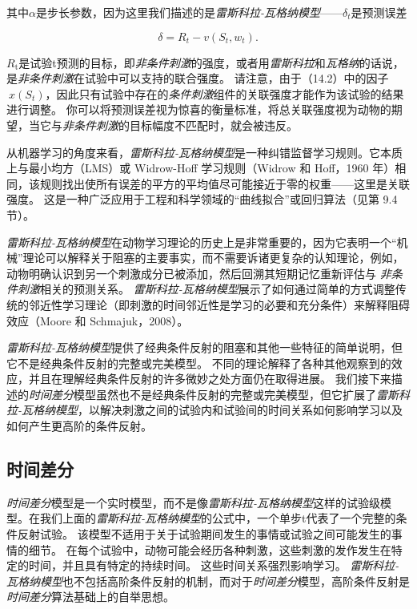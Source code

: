 其中$\alpha$是步长参数，因为这里我们描述的是\textit{雷斯科拉-瓦格纳模型}——$\delta_t $是预测误差

\begin{equation}\label{key}
	\delta = R_t - v (S_t, w_t).
\end{equation}


$R_{\mathrm{t}}$是试验t预测的目标，即\textit{非条件刺激}的强度，或者用\textit{雷斯科拉}和\textit{瓦格纳}的话说，是\textit{非条件刺激}在试验中可以支持的联合强度。
请注意，由于（14.2）中的因子$\ x(S_t)$，因此只有试验中存在的\textit{条件刺激}组件的关联强度才能作为该试验的结果进行调整。
你可以将预测误差视为惊喜的衡量标准，将总关联强度视为动物的期望，当它与\textit{非条件刺激}的目标幅度不匹配时，就会被违反。


从机器学习的角度来看，\textit{雷斯科拉-瓦格纳模型}是一种纠错监督学习规则。它本质上与最小均方（LMS）或 Widrow-Hoff 学习规则（Widrow 和 Hoff，1960 年）相同，该规则找出使所有误差的平方的平均值尽可能接近于零的权重——这里是关联强度。
这是一种广泛应用于工程和科学领域的“曲线拟合”或回归算法（见第 9.4 节）。




\textit{雷斯科拉-瓦格纳模型}在动物学习理论的历史上是非常重要的，因为它表明一个“机械”理论可以解释关于阻塞的主要事实，而不需要诉诸更复杂的认知理论，例如，动物明确认识到另一个刺激成分已被添加，然后回溯其短期记忆重新评估与 \textit{非条件刺激}相关的预测关系。
\textit{雷斯科拉-瓦格纳模型}展示了如何通过简单的方式调整传统的邻近性学习理论（即刺激的时间邻近性是学习的必要和充分条件）来解释阻碍效应（Moore 和 Schmajuk，2008）。


\textit{雷斯科拉-瓦格纳模型}提供了经典条件反射的阻塞和其他一些特征的简单说明，但它不是经典条件反射的完整或完美模型。
不同的理论解释了各种其他观察到的效应，并且在理解经典条件反射的许多微妙之处方面仍在取得进展。
我们接下来描述的\textit{时间差分}模型虽然也不是经典条件反射的完整或完美模型，但它扩展了\textit{雷斯科拉-瓦格纳模型}，以解决刺激之间的试验内和试验间的时间关系如何影响学习以及如何产生更高阶的条件反射。


\subsection{时间差分}

\textit{时间差分}模型是一个实时模型，而不是像\textit{雷斯科拉-瓦格纳模型}这样的试验级模型。在我们上面的\textit{雷斯科拉-瓦格纳模型}的公式中，一个单步t代表了一个完整的条件反射试验。
该模型不适用于关于试验期间发生的事情或试验之间可能发生的事情的细节。
在每个试验中，动物可能会经历各种刺激，这些刺激的发作发生在特定的时间，并且具有特定的持续时间。
这些时间关系强烈影响学习。
\textit{雷斯科拉-瓦格纳模型}也不包括高阶条件反射的机制，而对于\textit{时间差分}模型，高阶条件反射是\textit{时间差分}算法基础上的自举思想。



